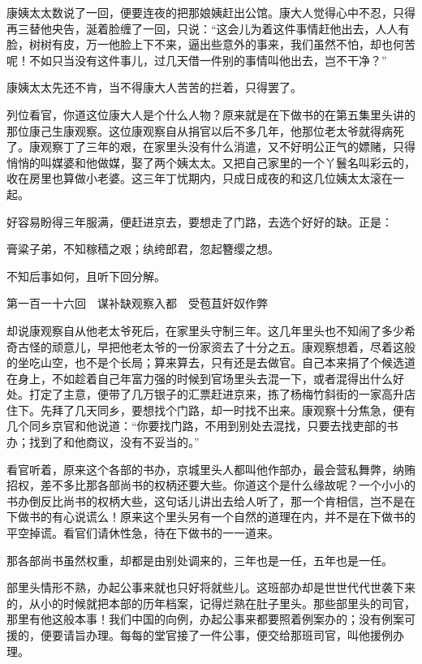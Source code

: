 \documentclass[12pt,UTF8]{ctexbook}
\begin{document}
{{{康姨太太数说了一回，便要连夜的把那娘姨赶出公馆。康大人觉得心中不忍，只得再三替他央告，涎着脸缠了一回，只说：“这会儿为着这件事情赶他出去，人人有脸，树树有皮，万一他脸上下不来，逼出些意外的事来，我们虽然不怕，却也何苦呢！不如只当没有这件事儿，过几天借一件别的事情叫他出去，岂不干净？”

康姨太太先还不肯，当不得康大人苦苦的拦着，只得罢了。

列位看官，你道这位康大人是个什么人物？原来就是在下做书的在第五集里头讲的那位康己生康观察。这位康观察自从捐官以后不多几年，他那位老太爷就得病死了。康观察丁了三年的艰，在家里头没有什么消遣，又不好明公正气的嫖赌，只得悄悄的叫媒婆和他做媒，娶了两个姨太太。又把自己家里的一个丫鬟名叫彩云的，收在房里也算做小老婆。这三年丁忧期内，只成日成夜的和这几位姨太太滚在一起。

好容易盼得三年服满，便赶进京去，要想走了门路，去选个好好的缺。正是：

膏粱子弟，不知稼穑之艰；纨绔郎君，忽起簪缨之想。

不知后事如何，且听下回分解。





第一百一十六回　谋补缺观察入都　受苞苴奸奴作弊





却说康观察自从他老太爷死后，在家里头守制三年。这几年里头也不知闹了多少希奇古怪的顽意儿，早把他老太爷的一份家资去了十分之五。康观察想着，尽着这般的坐吃山空，也不是个长局；算来算去，只有还是去做官。自己本来捐了个候选道在身上，不如趁着自己年富力强的时候到官场里头去混一下，或者混得出什么好处。打定了主意，便带了几万银子的汇票赶进京来，拣了杨梅竹斜街的一家高升店住下。先拜了几天同乡，要想找个门路，却一时找不出来。康观察十分焦急，便有几个同乡京官和他说道：“你要找门路，不用到别处去混找，只要去找吏部的书办；找到了和他商议，没有不妥当的。”

看官听着，原来这个各部的书办，京城里头人都叫他作部办，最会营私舞弊，纳贿招权，差不多比那各部尚书的权柄还要大些。你道这个是什么缘故呢？一个小小的书办倒反比尚书的权柄大些，这句话儿讲出去给人听了，那一个肯相信，岂不是在下做书的有心说谎么！原来这个里头另有一个自然的道理在内，并不是在下做书的平空掉谎。看官们请休性急，待在下做书的一一道来。

那各部尚书虽然权重，却都是由别处调来的，三年也是一任，五年也是一任。

部里头情形不熟，办起公事来就也只好将就些儿。这班部办却是世世代代世袭下来的，从小的时候就把本部的历年档案，记得烂熟在肚子里头。那些部里头的司官，那里有他这般本事！我们中国的向例，办起公事来都要照着例案办的；没有例案可援的，便要请旨办理。每每的堂官接了一件公事，便交给那班司官，叫他援例办理。

}}}
\end{document}

